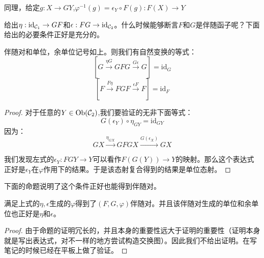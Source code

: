     同理，给定$g:X \to GY$,$\varphi^{-1}(g)=\epsilon_Y \circ F(g):F(X) \to Y$
    
    给出$\eta:\mathrm{id}_{\mathcal{C}_1} \to GF$和$\epsilon:FG \to \mathrm{id}_{\mathcal{C}_2}$。什么时候能够断言$F$和$G$是伴随函子呢？下面给出的必要条件正好是充分的。
    \begin{lemma}{}
        伴随对和单位，余单位记号如上。则我们有自然变换的等式：
        $$
        [G \overset{\eta G}{\to} GFG \overset{G\epsilon}{\to} G]=\mathrm{id}_G
        $$
        $$
        [F \overset{F \eta}{\to} FGF \overset{\epsilon F}{\to}F]=\mathrm{id}_F
        $$
    \end{lemma}
    \begin{proof}
        对于任意的$Y \in \mathrm{Ob}(\mathcal{C}_2)$,我们要验证的无非下面等式：
        $$
        G(\epsilon_Y)\circ \eta_{GY}=\mathrm{id}_{GY}
        $$
        因为：
        $$
        GX \overset{\eta_{GX}}{\longrightarrow} GFGX \overset{G(\epsilon_X)}{\longrightarrow} GX
        $$

        我们发现左式的$\epsilon_Y:FGY \to Y$可以看作$F(G(Y)) \to Y$的映射。那么这个表达式正好是$\epsilon_Y$在$\varphi$作用下的结果。于是该态射复合得到的结果是单位态射。
    \end{proof}
    下面的命题说明了这个条件正好也能得到伴随对。
    \begin{proposition}{}
        满足上式的$\eta,\epsilon$生成的$\varphi$得到了$(F,G,\varphi)$伴随对。并且该伴随对生成的单位和余单位也正好是$\eta$和$\epsilon$。
     \end{proposition}
     \begin{proof}
        由于命题的证明冗长的，并且本身的重要性远大于证明的重要性（证明本身就是写出表达式，对不一样的地方尝试构造交换图）。因此我们不给出证明。在写笔记的时候已经在平板上做了验证。
     \end{proof}

